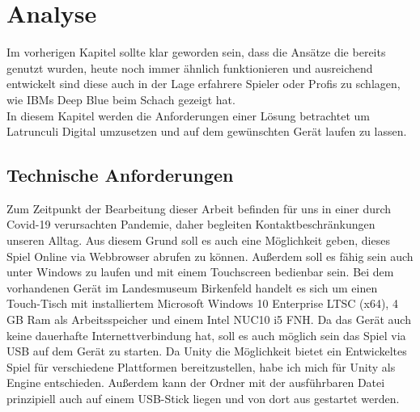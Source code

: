 
\chapter{Analyse}
\label{ch:Analyse}
Im vorherigen Kapitel sollte klar geworden sein, dass die Ansätze die bereits genutzt wurden, heute noch immer ähnlich funktionieren und ausreichend entwickelt sind diese auch in der Lage erfahrere Spieler oder Profis zu schlagen, wie IBMs Deep Blue beim Schach gezeigt hat.\\
In diesem Kapitel werden die Anforderungen einer Lösung betrachtet um Latrunculi Digital umzusetzen und auf dem gewünschten Gerät laufen zu lassen.


\section{Technische Anforderungen}
\label{ch:Analyse:sec:TechAnforderungen}
Zum Zeitpunkt der Bearbeitung dieser Arbeit befinden für uns in einer durch Covid-19 verursachten Pandemie, daher begleiten Kontaktbeschränkungen unseren Alltag. Aus diesem Grund soll es auch eine Möglichkeit geben, dieses Spiel Online via Webbrowser abrufen zu können. Außerdem soll es fähig sein auch unter Windows zu laufen und mit einem Touchscreen bedienbar sein. Bei dem vorhandenen Gerät im Landesmuseum Birkenfeld handelt es sich um einen Touch-Tisch mit installiertem Microsoft Windows 10 Enterprise LTSC (x64), 4 GB Ram als Arbeitsspeicher und einem Intel NUC10 i5 FNH. Da das Gerät auch keine dauerhafte Internettverbindung hat, soll es auch möglich sein das Spiel via USB auf dem Gerät zu starten. Da Unity die Möglichkeit bietet ein Entwickeltes Spiel für verschiedene Plattformen bereitzustellen, habe ich mich für Unity als Engine entschieden. Außerdem kann der Ordner mit der ausführbaren Datei prinzipiell auch auf einem USB-Stick liegen und von dort aus gestartet werden.


